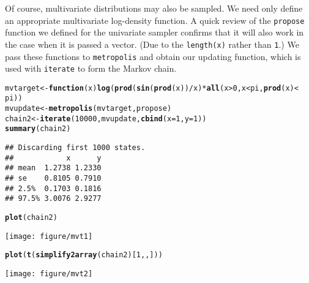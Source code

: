 \documentclass{article}\usepackage[]{graphicx}\usepackage[]{color}
\makeatletter
\def\maxwidth{ %
  \ifdim\Gin@nat@width>\linewidth
    \linewidth
  \else
    \Gin@nat@width
  \fi
}
\newcommand{\hlnum}[1]{\textcolor[rgb]{0.686,0.059,0.569}{#1}}%
\newcommand{\hlopt}[1]{\textcolor[rgb]{0,0,0}{#1}}%
\newcommand{\hlstd}[1]{\textcolor[rgb]{0.345,0.345,0.345}{#1}}%
\newcommand{\hlkwa}[1]{\textcolor[rgb]{0.161,0.373,0.58}{\textbf{#1}}}%
\newcommand{\hlkwb}[1]{\textcolor[rgb]{0.69,0.353,0.396}{#1}}%
\newcommand{\hlkwc}[1]{\textcolor[rgb]{0.333,0.667,0.333}{#1}}%
\newcommand{\hlkwd}[1]{\textcolor[rgb]{0.737,0.353,0.396}{\textbf{#1}}}%
\newenvironment{kframe}{%
 \def\at@end@of@kframe{}%
 \ifinner\ifhmode%
  \def\at@end@of@kframe{\end{minipage}}%
  \begin{minipage}{\columnwidth}%
 \fi\fi%
 \def\FrameCommand##1{\hskip\@totalleftmargin \hskip-\fboxsep
 \colorbox{shadecolor}{##1}\hskip-\fboxsep
     \hskip-\linewidth \hskip-\@totalleftmargin \hskip\columnwidth}%
 \MakeFramed {\advance\hsize-\width
   \@totalleftmargin\z@ \linewidth\hsize
   \@setminipage}}%
 {\par\unskip\endMakeFramed%
 \at@end@of@kframe}
\newenvironment{knitrout}{}{} %
\makeatother
\begin{document}
Of course, multivariate distributions may also be sampled. We need
only define an appropriate multivariate log-density function. A quick
review of the {\tt propose} function we defined for the univariate
sampler confirms that it will also work in the case when it is passed
a vector. (Due to the {\tt length(x)} rather than {\tt 1}.) We pass these functions to
{\tt metropolis} and obtain our updating function, which is used with
{\tt iterate} to form the Markov chain.
\begin{knitrout}
\color{fgcolor}\begin{kframe}
\begin{alltt}
\hlstd{mvtarget} \hlkwb{<-} \hlkwa{function}\hlstd{(}\hlkwc{x}\hlstd{)} \hlkwd{log}\hlstd{(}\hlkwd{prod}\hlstd{(}\hlkwd{sin}\hlstd{(}\hlkwd{prod}\hlstd{(x))}\hlopt{/}\hlstd{x)} \hlopt{*} \hlkwd{all}\hlstd{(x} \hlopt{>} \hlnum{0}\hlstd{, x} \hlopt{<} \hlstd{pi,} \hlkwd{prod}\hlstd{(x)} \hlopt{<}
    \hlstd{pi))}
\hlstd{mvupdate} \hlkwb{<-} \hlkwd{metropolis}\hlstd{(mvtarget, propose)}
\hlstd{chain2} \hlkwb{<-} \hlkwd{iterate}\hlstd{(}\hlnum{10000}\hlstd{, mvupdate,} \hlkwd{cbind}\hlstd{(}\hlkwc{x} \hlstd{=} \hlnum{1}\hlstd{,} \hlkwc{y} \hlstd{=} \hlnum{1}\hlstd{))}
\hlkwd{summary}\hlstd{(chain2)}
\end{alltt}
\begin{verbatim}
## Discarding first 1000 states.
##            x      y
## mean  1.2738 1.2330
## se    0.8105 0.7910
## 2.5%  0.1703 0.1816
## 97.5% 3.0076 2.9277
\end{verbatim}
\begin{alltt}
\hlkwd{plot}\hlstd{(chain2)}
\end{alltt}
\end{kframe}
\texttt{[image: figure/mvt1]} 
\begin{kframe}\begin{alltt}
\hlkwd{plot}\hlstd{(}\hlkwd{t}\hlstd{(}\hlkwd{simplify2array}\hlstd{(chain2)[}\hlnum{1}\hlstd{, , ]))}
\end{alltt}
\end{kframe}
\texttt{[image: figure/mvt2]} 

\end{knitrout}
\end{document}
